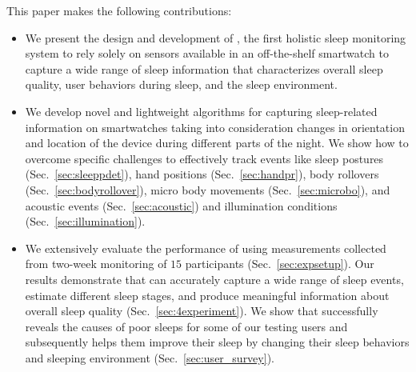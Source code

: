 This paper makes the following contributions:

\begin{itemize}
	\item We present the design and development of {\systemname}, the first holistic sleep monitoring system to rely solely on sensors
available in an off-the-shelf smartwatch to capture a wide range of sleep information that characterizes overall sleep quality, user
behaviors during sleep, and the sleep environment.
	
\item We develop novel and lightweight algorithms for capturing sleep-related information on smartwatches taking into consideration changes
in orientation and location of the device during different parts of the night. We show how to overcome specific challenges to effectively
track events like sleep postures (Sec.~\ref{sec:sleeppdet}), hand positions (Sec.~\ref{sec:handpr}), body rollovers
(Sec.~\ref{sec:bodyrollover}), micro body movements (Sec.~\ref{sec:microbo}), and acoustic events (Sec.~\ref{sec:acoustic}) and
illumination conditions (Sec.~\ref{sec:illumination}).
	

    \item We extensively evaluate the performance of {\systemname} using measurements collected from two-week monitoring of $15$
    participants (Sec.~\ref{sec:expsetup}). Our results demonstrate that {\systemname} can accurately capture a wide range of sleep events,
    estimate different sleep stages, and produce meaningful information about overall sleep quality (Sec.~\ref{sec:4experiment}).  We show
    that {\systemname} successfully reveals the causes of poor sleeps for some of our testing users and subsequently helps them improve
    their sleep by changing their sleep behaviors and sleeping environment  (Sec.~\ref{sec:user_survey}).
\end{itemize}
